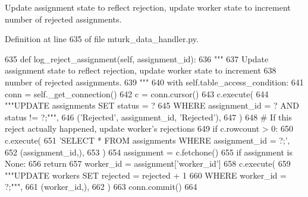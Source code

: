 \begin{DoxyVerb}Update assignment state to reflect rejection, update worker state to increment
number of rejected assignments.
\end{DoxyVerb}
 

Definition at line 635 of file mturk\+\_\+data\+\_\+handler.\+py.


\begin{DoxyCode}
635     \textcolor{keyword}{def }log\_reject\_assignment(self, assignment\_id):
636         \textcolor{stringliteral}{"""}
637 \textcolor{stringliteral}{        Update assignment state to reflect rejection, update worker state to increment}
638 \textcolor{stringliteral}{        number of rejected assignments.}
639 \textcolor{stringliteral}{        """}
640         with self.table\_access\_condition:
641             conn = self.\_get\_connection()
642             c = conn.cursor()
643             c.execute(
644                 \textcolor{stringliteral}{"""UPDATE assignments SET status = ?}
645 \textcolor{stringliteral}{                         WHERE assignment\_id = ? AND status != ?;"""},
646                 (\textcolor{stringliteral}{'Rejected'}, assignment\_id, \textcolor{stringliteral}{'Rejected'}),
647             )
648             \textcolor{comment}{# If this reject actually happened, update worker's rejections}
649             \textcolor{keywordflow}{if} c.rowcount > 0:
650                 c.execute(
651                     \textcolor{stringliteral}{'SELECT * FROM assignments WHERE assignment\_id = ?;'},
652                     (assignment\_id,),
653                 )
654                 assignment = c.fetchone()
655                 \textcolor{keywordflow}{if} assignment \textcolor{keywordflow}{is} \textcolor{keywordtype}{None}:
656                     \textcolor{keywordflow}{return}
657                 worker\_id = assignment[\textcolor{stringliteral}{'worker\_id'}]
658                 c.execute(
659                     \textcolor{stringliteral}{"""UPDATE workers SET rejected = rejected + 1}
660 \textcolor{stringliteral}{                             WHERE worker\_id = ?;"""},
661                     (worker\_id,),
662                 )
663             conn.commit()
664 
\end{DoxyCode}
\mbox{\label{classparlai_1_1mturk_1_1core_1_1legacy__2018_1_1mturk__data__handler_1_1MTurkDataHandler_a203c9543a46716e6e51d4d1e795385f5}} 
